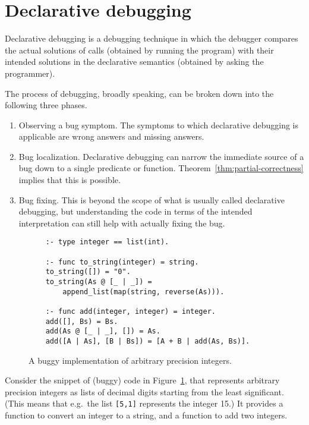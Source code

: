 \section{Declarative debugging}
\label{sec:decl-debug}

Declarative debugging is a debugging technique
in which the debugger compares the actual solutions of calls
(obtained by running the program)
with their intended solutions in the declarative semantics
(obtained by asking the programmer).

The process of debugging, broadly speaking,
can be broken down into the following three phases.
\begin{enumerate}
\item
Observing a bug symptom.
The symptoms to which declarative debugging is applicable
are wrong answers and missing answers.
\item
Bug localization.
Declarative debugging can narrow the immediate source of a bug
down to a single predicate or function.
Theorem~\ref{thm:partial-correctness} implies that this is possible.
\item
Bug fixing.
This is beyond the scope of what is usually called declarative debugging,
but understanding the code in terms of the intended interpretation
can still help with actually fixing the bug.
\end{enumerate}

\begin{figure}[htb]
\begin{verbatim}
    :- type integer == list(int).

    :- func to_string(integer) = string.
    to_string([]) = "0".
    to_string(As @ [_ | _]) =
        append_list(map(string, reverse(As))).

    :- func add(integer, integer) = integer.
    add([], Bs) = Bs.
    add(As @ [_ | _], []) = As.
    add([A | As], [B | Bs]) = [A + B | add(As, Bs)].
\end{verbatim}
\caption{A buggy implementation of arbitrary precision integers.
\label{fig:buggy-ints}}
\end{figure}

Consider the snippet of (buggy) code in Figure~\ref{fig:buggy-ints},
that represents arbitrary precision integers
as lists of decimal digits
starting from the least significant.
(This means that e.g.\ the list \texttt{[5,1]} represents the integer 15.)
It provides a function
to convert an integer to a string,
and a function to add two integers.


